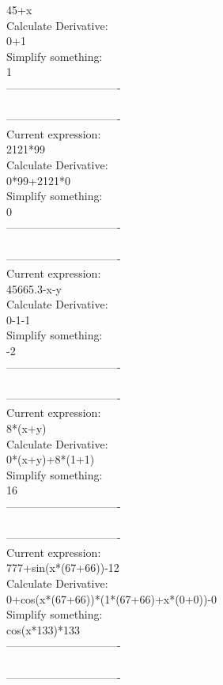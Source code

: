 \documentclass[12pt]{article}
\begin{document}
45+x\\
Calculate Derivative:\\
0+1\\
Simplify something:\\
1\\
-------------------------------\\
\\
-------------------------------\\
Current expression:\\
2121*99\\
Calculate Derivative:\\
0*99+2121*0\\
Simplify something:\\
0\\
-------------------------------\\
\\
-------------------------------\\
Current expression:\\
45665.3-x-y\\
Calculate Derivative:\\
0-1-1\\
Simplify something:\\
-2\\
-------------------------------\\
\\
-------------------------------\\
Current expression:\\
8*(x+y)\\
Calculate Derivative:\\
0*(x+y)+8*(1+1)\\
Simplify something:\\
16\\
-------------------------------\\
\\
-------------------------------\\
Current expression:\\
777+sin(x*(67+66))-12\\
Calculate Derivative:\\
0+cos(x*(67+66))*(1*(67+66)+x*(0+0))-0\\
Simplify something:\\
cos(x*133)*133\\
-------------------------------\\
\\
-------------------------------\\
\end{document}
